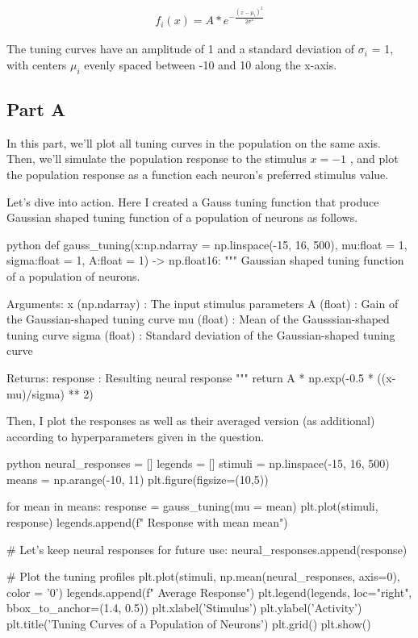\documentclass[12pt]{amsart}
\begin{document}
\begin{align}
    f_i (x) = A * e^{ - \frac{(x - \mu_i)^2}{2 \sigma ^ 2}}
\end{align}

The tuning curves have an amplitude of 1 and a standard deviation of $\sigma_i$ = 1, with centers
$\mu_i$ evenly spaced between -10 and 10 along the x-axis.

\subsection{Part A}
In this part, we'll plot all tuning curves in the population on the same axis. Then, we'll simulate the  population response to the stimulus $x = -1$ , and plot the population response as a function each neuron's preferred stimulus value.

\bigskip
Let's dive into action. Here I created a Gauss tuning function that produce Gaussian shaped tuning function of a population of neurons as follows.

\begin{mintedbox}{python}
def gauss_tuning(x:np.ndarray = np.linspace(-15, 16, 500),
                 mu:float = 1,
                 sigma:float = 1,
                 A:float = 1) -> np.float16:
    """
        Gaussian shaped tuning function of a population of neurons.

        Arguments:
            x     (np.ndarray)   : The input stimulus parameters
            A     (float)        : Gain of the Gaussian-shaped tuning curve
            mu    (float)   : Mean of the Gausssian-shaped tuning curve
            sigma (float)        : Standard deviation of the Gaussian-shaped tuning curve

        Returns:
            response : Resulting neural response
        """             
    return A * np.exp(-0.5 * ((x- mu)/sigma) ** 2)
\end{mintedbox}

Then, I plot the responses as well as their averaged version (as additional) according to hyperparameters given in the question.

\begin{mintedbox}{python}
neural_responses = []
legends = []
stimuli = np.linspace(-15, 16, 500)
means = np.arange(-10, 11)
plt.figure(figsize=(10,5))

for mean in means:
    response = gauss_tuning(mu = mean)
    plt.plot(stimuli, response)
    legends.append(f" Response with mean {mean}")
    
    # Let's keep neural responses for future use:
    neural_responses.append(response)

# Plot the tuning profiles
plt.plot(stimuli, np.mean(neural_responses, axis=0), color = '0')
legends.append(f" Average Response")
plt.legend(legends, loc="right", bbox_to_anchor=(1.4, 0.5))
plt.xlabel('Stimulus')
plt.ylabel('Activity')
plt.title('Tuning Curves of a Population of Neurons')
plt.grid()
plt.show()
\end{mintedbox}
\end{document}
